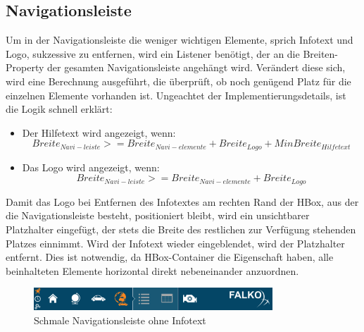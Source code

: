 \subsection{Navigationsleiste}
Um in der Navigationsleiste die weniger wichtigen Elemente, sprich Infotext und Logo, sukzessive zu entfernen, wird ein Listener benötigt, der an die Breiten-Property der gesamten Navigationsleiste angehängt wird. Verändert diese sich, wird eine Berechnung ausgeführt, die überprüft, ob noch genügend Platz für die einzelnen Elemente vorhanden ist. Ungeachtet der Implementierungsdetails, ist die Logik schnell erklärt:
\begin{itemize}
	\item Der Hilfetext wird angezeigt, wenn:
 		\begin{equation}
 			Breite_{Navi-leiste} >= Breite_{Navi-elemente} + Breite_{Logo} + MinBreite_{Hilfetext}
 		\end{equation}
 	\item Das Logo wird angezeigt, wenn:
 		\begin{equation}
	 		Breite_{Navi-leiste} >= Breite_{Navi-elemente} + Breite_{Logo}
 		\end{equation}
\end{itemize}
Damit das Logo bei Entfernen des Infotextes am rechten Rand der HBox, aus der die Navigationsleiste besteht, positioniert bleibt, wird ein unsichtbarer Platzhalter eingefügt, der stets die Breite des restlichen zur Verfügung stehenden Platzes einnimmt. Wird der Infotext wieder eingeblendet, wird der Platzhalter entfernt. Dies ist notwendig, da HBox-Container die Eigenschaft haben, alle beinhalteten Elemente horizontal direkt nebeneinander anzuordnen.\par
\begin{figure}[H]
 \centering
 \includegraphics[width=0.8\textwidth]{grafiken/fix_nav.png}
 \caption{Schmale Navigationsleiste ohne Infotext}
 \label{fig:fixNav}
\end{figure}
